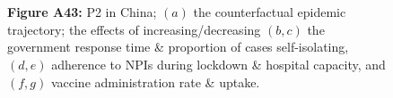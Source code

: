 \documentclass[paper=a4,fontsize=11pt]{article}
\begin{document}
\begin{figure}[!h]
  \\
  \hspace{1.76cm}
  \\
  \caption*{\textbf{Figure A43:} P2 in China; $(a)$ the counterfactual epidemic trajectory; the effects of increasing/decreasing $(b,c)$ the government response time \& proportion of cases self-isolating, $(d,e)$ adherence to NPIs during lockdown \& hospital capacity, and $(f,g)$ vaccine administration rate \& uptake.}
\end{figure}
\end{document}
